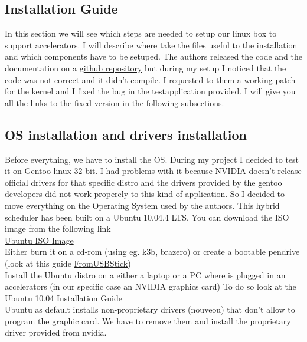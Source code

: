 \documentclass[a4paper,13pt]{article}
\begin{document}
\begin{multicols}{2}
\vspace{50ex}
\section{Installation Guide \cite{doc_testapp}}

In this section we will see which steps are needed to setup our linux box to support accelerators.
I will describe where take the files useful to the installation and which components have to be setuped.
The authors released the code and the documentation on a \href{https://github.com/pc2/hetsched.git}{github repository} but during my setup I noticed
that the code was not correct and it didn't compile. I requested to them a working patch for the kernel
and I fixed the bug in the testapplication provided. I will give you all the links to the fixed version
in the following subsections.

\subsection{OS installation and drivers installation}
    Before everything, we have to install the OS. During my project I decided to test it on Gentoo linux 32 bit.
    I had problems with it because NVIDIA doesn't release official drivers for that specific distro and the drivers
    provided by the gentoo developers did not work properely to this kind of application. So I decided to move
    everything on the Operating System used by the authors.
    This hybrid scheduler has been built on a Ubuntu 10.04.4 LTS.
    You can download the ISO image from the following link\\
    \href{https://mega.co.nz/#!IodSWLZS!FHynfh_DNqm0Kb1rWb9ckX_uT68BPhaFthWQh34EuWk}{Ubuntu ISO Image}\\
    Either burn it on a cd-rom (using eg. k3b, brazero) or create a bootable pendrive (look at this guide \href{https://help.ubuntu.com/community/Installation/FromUSBStick}{FromUSBStick})\\
    Install the Ubuntu distro on a either a laptop or a PC where is plugged in an accelerators (in our specific case an NVIDIA graphics card)
    To do  so look at the \href{https://help.ubuntu.com/10.04/installation-guide/i386/}{Ubuntu 10.04 Installation Guide}\\
    Ubuntu as default installs non-proprietary drivers (nouveou) that don't allow to program the graphic card. We have to remove them and install the proprietary driver provided from nvidia.
\end{multicols}
\end{document}
